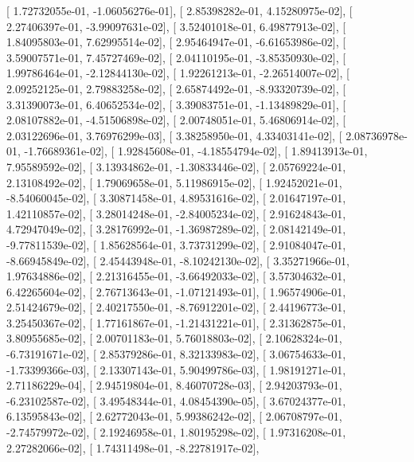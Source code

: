 \documentclass{article}
\begin{document}
       [  1.72732055e-01,  -1.06056276e-01],
       [  2.85398282e-01,   4.15280975e-02],
       [  2.27406397e-01,  -3.99097631e-02],
       [  3.52401018e-01,   6.49877913e-02],
       [  1.84095803e-01,   7.62995514e-02],
       [  2.95464947e-01,  -6.61653986e-02],
       [  3.59007571e-01,   7.45727469e-02],
       [  2.04110195e-01,  -3.85350930e-02],
       [  1.99786464e-01,  -2.12844130e-02],
       [  1.92261213e-01,  -2.26514007e-02],
       [  2.09252125e-01,   2.79883258e-02],
       [  2.65874492e-01,  -8.93320739e-02],
       [  3.31390073e-01,   6.40652534e-02],
       [  3.39083751e-01,  -1.13489829e-01],
       [  2.08107882e-01,  -4.51506898e-02],
       [  2.00748051e-01,   5.46806914e-02],
       [  2.03122696e-01,   3.76976299e-03],
       [  3.38258950e-01,   4.33403141e-02],
       [  2.08736978e-01,  -1.76689361e-02],
       [  1.92845608e-01,  -4.18554794e-02],
       [  1.89413913e-01,   7.95589592e-02],
       [  3.13934862e-01,  -1.30833446e-02],
       [  2.05769224e-01,   2.13108492e-02],
       [  1.79069658e-01,   5.11986915e-02],
       [  1.92452021e-01,  -8.54060045e-02],
       [  3.30871458e-01,   4.89531616e-02],
       [  2.01647197e-01,   1.42110857e-02],
       [  3.28014248e-01,  -2.84005234e-02],
       [  2.91624843e-01,   4.72947049e-02],
       [  3.28176992e-01,  -1.36987289e-02],
       [  2.08142149e-01,  -9.77811539e-02],
       [  1.85628564e-01,   3.73731299e-02],
       [  2.91084047e-01,  -8.66945849e-02],
       [  2.45443948e-01,  -8.10242130e-02],
       [  3.35271966e-01,   1.97634886e-02],
       [  2.21316455e-01,  -3.66492033e-02],
       [  3.57304632e-01,   6.42265604e-02],
       [  2.76713643e-01,  -1.07121493e-01],
       [  1.96574906e-01,   2.51424679e-02],
       [  2.40217550e-01,  -8.76912201e-02],
       [  2.44196773e-01,   3.25450367e-02],
       [  1.77161867e-01,  -1.21431221e-01],
       [  2.31362875e-01,   3.80955685e-02],
       [  2.00701183e-01,   5.76018803e-02],
       [  2.10628324e-01,  -6.73191671e-02],
       [  2.85379286e-01,   8.32133983e-02],
       [  3.06754633e-01,  -1.73399366e-03],
       [  2.13307143e-01,   5.90499786e-03],
       [  1.98191271e-01,   2.71186229e-04],
       [  2.94519804e-01,   8.46070728e-03],
       [  2.94203793e-01,  -6.23102587e-02],
       [  3.49548344e-01,   4.08454390e-05],
       [  3.67024377e-01,   6.13595843e-02],
       [  2.62772043e-01,   5.99386242e-02],
       [  2.06708797e-01,  -2.74579972e-02],
       [  2.19246958e-01,   1.80195298e-02],
       [  1.97316208e-01,   2.27282066e-02],
       [  1.74311498e-01,  -8.22781917e-02],
\end{document}
